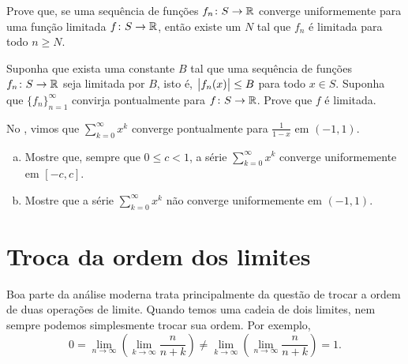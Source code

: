 \begin{exercise}
Prove que, se uma sequência de funções $f_n \colon S \to {\mathbb{R}}$ converge
uniformemente para uma função limitada $f \colon S \to {\mathbb{R}}$, então existe
um $N$ tal que $f_n$ é limitada para todo $n \geq N$.
\end{exercise}

\begin{exercise}
Suponha que exista uma constante $B$ tal que uma sequência de funções
$f_n \colon S \to {\mathbb{R}}$ seja limitada por $B$, isto é,
$\bigl\lvert {f_n(x)} \bigr\rvert \leq B$ para todo $x \in S$.
Suponha que $\{ f_n \}_{n=1}^\infty$ convirja pontualmente para
$f \colon S \to {\mathbb{R}}$. Prove que $f$ é limitada.
\end{exercise}

\begin{exercise}
No , vimos que
$\sum_{k=0}^\infty x^k$ converge pontualmente para $\frac{1}{1-x}$ em
$(-1,1)$.
\begin{enumerate}[a)]
\item
Mostre que, sempre que $0 \leq c < 1$, a série
$\sum_{k=0}^\infty x^k$ converge uniformemente em $[-c,c]$.
\item
Mostre que a série $\sum_{k=0}^\infty x^k$ não converge uniformemente
em $(-1,1)$.
\end{enumerate}
\end{exercise}


\sectionnewpage
\section{Troca da ordem dos limites}
\label{sec:liminter}



Boa parte da análise moderna trata principalmente da questão de trocar a
ordem de duas operações de limite. Quando temos uma cadeia de dois limites,
nem sempre podemos simplesmente trocar sua ordem. Por exemplo,
\begin{equation*}
0 = 
\lim_{n\to\infty}
\left(
\lim_{k\to\infty}
\frac{n}{n + k}
\right)
\neq
\lim_{k\to\infty}
\left(
\lim_{n\to\infty}
\frac{n}{n + k}
\right)
= 1 .
\end{equation*}

